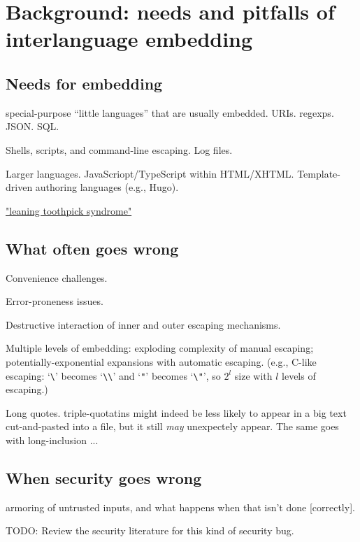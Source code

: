 \section{Background: needs and pitfalls of interlanguage embedding}
\label{sec:bg}

\subsection{Needs for embedding}

special-purpose ``little languages'' that are usually embedded.
URIs. regexps. JSON. SQL.

Shells, scripts, and command-line escaping.
Log files.

Larger languages.  JavaScriopt/TypeScript within HTML/XHTML.
Template-driven authoring languages (e.g., Hugo).


\href{https://en.wikipedia.org/wiki/Leaning_toothpick_syndrome}{"leaning toothpick syndrome"}

\subsection{What often goes wrong}

Convenience challenges.

Error-proneness issues.

Destructive interaction of inner and outer escaping mechanisms.

Multiple levels of embedding: exploding complexity of manual escaping;
potentially-exponential expansions with automatic escaping.
(e.g., C-like escaping: `\verb|\|' becomes `\verb|\\|'
and `\verb|"|' becomes `\verb|\"|',
so $2^l$ size with $l$ levels of escaping.)


Long quotes.  
triple-quotatins might indeed be less likely to appear
in a big text cut-and-pasted into a file,
but it still \emph{may} unexpectely appear.
The same goes with long-inclusion ...

\subsection{When security goes wrong}

armoring of untrusted inputs,
and what happens when that isn't done [correctly].

TODO: Review the security literature for this kind of security bug.

